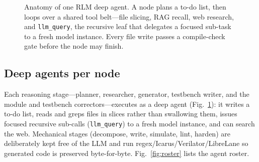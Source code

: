 \documentclass[conference]{IEEEtran}
\begin{document}
\begin{figure}[t]
\centering
{}
\caption{Anatomy of one RLM deep agent. A node plans a to-do list, then loops over a shared
tool belt---file slicing, RAG recall, web research, and \texttt{llm\_query}, the recursive
leaf that delegates a focused sub-task to a fresh model instance. Every file write passes a
compile-check gate before the node may finish.}
\label{fig:rlm}
\end{figure}

\subsection{Deep agents per node}
Each reasoning stage---planner, researcher, generator, testbench writer, and the
module and testbench correctors---executes as a deep agent
(Fig.~\ref{fig:rlm}): it writes a to-do list, reads and greps files in slices
rather than swallowing them, issues focused recursive sub-calls
(\texttt{llm\_query}) to a fresh model instance, and can search the web.
Mechanical stages (decompose, write, simulate, lint, harden) are deliberately
kept free of the LLM and run regex/Icarus/Verilator/LibreLane so generated code
is preserved byte-for-byte. Fig.~\ref{fig:roster} lists the agent roster.
\end{document}
